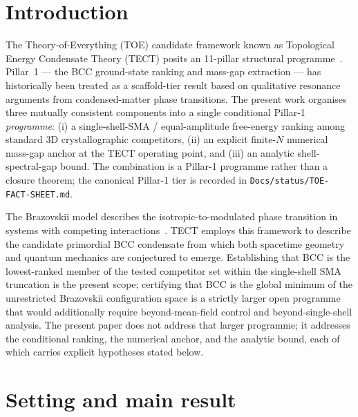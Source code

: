 \maketitle

\section{Introduction}
The Theory-of-Everything (TOE) candidate framework known as Topological
Energy Condensate Theory (TECT) posits an 11-pillar structural
programme~\cite{Math60}. Pillar~1 --- the BCC ground-state ranking
and mass-gap extraction --- has historically been treated as a
scaffold-tier result based on qualitative resonance arguments from
condensed-matter phase transitions. The present work organises three
mutually consistent components into a single conditional Pillar-1
\emph{programme}: (i) a single-shell-SMA / equal-amplitude
free-energy ranking among standard 3D crystallographic competitors,
(ii) an explicit finite-$N$ numerical mass-gap anchor at the TECT
operating point, and (iii) an analytic shell-spectral-gap bound. The
combination is a Pillar-1 programme rather than a closure theorem;
the canonical Pillar-1 tier is recorded in
\texttt{Docs/status/TOE-FACT-SHEET.md}.

The Brazovskii model describes the isotropic-to-modulated phase
transition in systems with competing interactions~\cite{Math97}. TECT
employs this framework to describe the candidate primordial BCC
condensate from which both spacetime geometry and quantum mechanics
are conjectured to emerge. Establishing that BCC is the lowest-ranked
member of the tested competitor set within the single-shell SMA
truncation is the present scope; certifying that BCC is the global
minimum of the unrestricted Brazovskii configuration space is a
strictly larger open programme that would additionally require
beyond-mean-field control and beyond-single-shell analysis. The
present paper does not address that larger programme; it addresses
the conditional ranking, the numerical anchor, and the analytic
bound, each of which carries explicit hypotheses stated below.

\section{Setting and main result}
